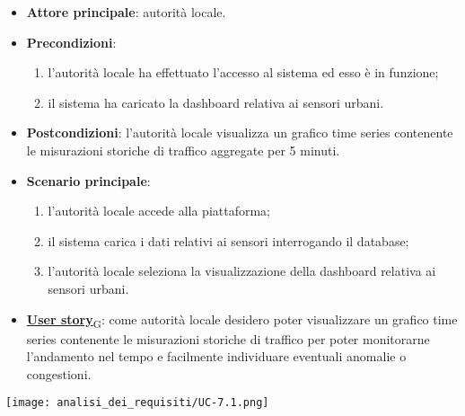 \begin{itemize}
	\item \textbf{Attore principale}: autorità locale.
	\item \textbf{Precondizioni}:
	      \begin{enumerate}
		      \item l'autorità locale ha effettuato l'accesso al sistema ed esso è in funzione;
		      \item il sistema ha caricato la dashboard relativa ai sensori urbani.
	      \end{enumerate}
	\item \textbf{Postcondizioni}: l'autorità locale visualizza un grafico time series contenente le misurazioni storiche di traffico aggregate per 5 minuti.
	\item \textbf{Scenario principale}:
	      \begin{enumerate}
		      \item l'autorità locale accede alla piattaforma;
		      \item il sistema carica i dati relativi ai sensori interrogando il database;
		      \item l'autorità locale seleziona la visualizzazione della dashboard relativa ai sensori urbani.
	      \end{enumerate}
	\item \href{https://7last.github.io/docs/rtb/documentazione-interna/glossario\#user-story}{\textbf{User story}\textsubscript{G}}:
	      come autorità locale desidero poter visualizzare un grafico time series contenente le misurazioni storiche
	      di traffico per poter monitorarne l'andamento nel tempo e facilmente individuare eventuali anomalie
	      o congestioni.
\end{itemize}
\begin{center}
	\texttt{[image: analisi\_dei\_requisiti/UC-7.1.png]}
\end{center}


